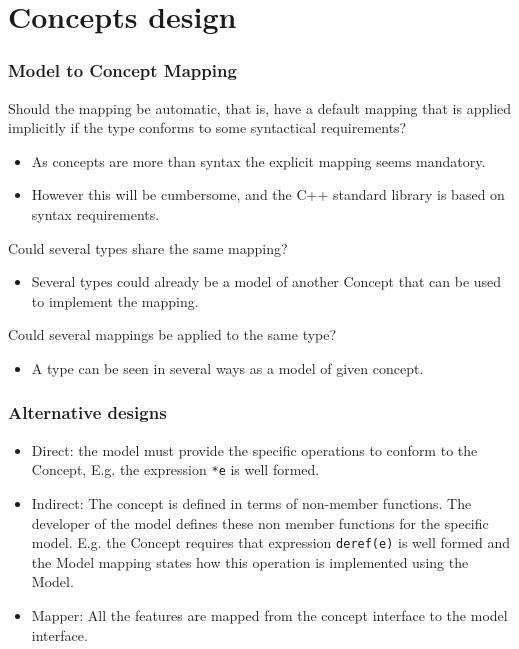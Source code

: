 \documentclass[xcolor=dvipsnames]{beamer}
\newcommand{\cpp}[1]{\lstinline{#1}}
\begin{document}
\section{Concepts design}
\begin{frame}[fragile]
\frametitle{Model to Concept Mapping}

Should the mapping be automatic, that is, have a default mapping that is applied implicitly if the type conforms to some syntactical requirements? 

\begin{itemize}
  \item As concepts are more than syntax the explicit mapping seems mandatory. 
  \item However this will be cumbersome, and the C++ standard library is based on syntax requirements.
\end{itemize}

Could several types share the same mapping?

\begin{itemize}
  \item Several types could already be a model of another Concept that can be used to implement the mapping. 
\end{itemize}

Could several mappings be applied to the same type?

\begin{itemize}
  \item A type can be seen in several ways as a model of given concept. 
\end{itemize}


\end{frame}
\begin{frame}[fragile]
\frametitle{Alternative designs}

\begin{itemize}
  \item Direct: the model must provide the specific operations to conform to the Concept, E.g. the expression \cpp{*e} is well formed.
  \item Indirect: The concept is defined in terms of non-member functions. The developer of the model defines these non member functions for the specific model. E.g. the Concept requires that expression \cpp{deref(e)} is well formed and the Model mapping states how this operation is implemented using the Model.
  \item Mapper: All the features are mapped from the concept interface to the model interface. 
\end{itemize}
\end{frame}
\end{document}

